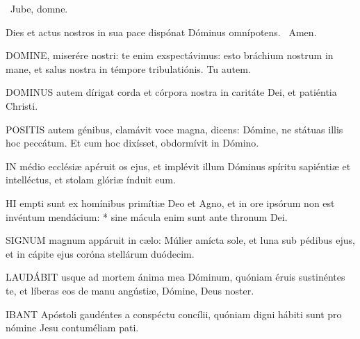 \V\ Jube, domne.

 Dies et actus nostros in sua pace dispónat Dóminus omnípotens. \R\ Amen.



\lettrine[lines=2]{D}{OMINE}, miserére nostri: te enim exspectávimus: esto bráchium nostrum in mane, et salus nostra in témpore tribulatiónis. Tu autem.



\lettrine[lines=2]{D}{OMINUS} autem dírigat corda et córpora nostra in caritáte Dei, et patiéntia Christi.



\lettrine[lines=2]{P}{OSITIS} autem génibus, clamávit voce magna, dicens: Dómine, ne státuas illis hoc peccátum. Et cum hoc dixísset, obdormívit in Dómino.


\lettrine[lines=2]{I}{N} médio ecclésiæ apéruit os ejus, et implévit illum Dóminus spíritu sapiéntiæ et intelléctus, et stolam glóriæ índuit eum.


\lettrine[lines=2]{H}{I} empti sunt ex homínibus primítiæ Deo et Agno, et in ore ipsórum non est invéntum mendácium: * sine mácula enim sunt ante thronum Dei.



\lettrine[lines=2]{S}{IGNUM} magnum appáruit in cælo: Múlier amícta sole, et luna sub pédibus ejus, et in cápite ejus coróna stellárum duódecim.


\lettrine[lines=2]{L}{AUDÁBIT} usque ad mortem ánima mea Dóminum, quóniam éruis sustinéntes te, et líberas eos de manu angústiæ, Dómine, Deus noster.



\lettrine[lines=2]{I}{BANT} Apóstoli gaudéntes a conspéctu concílii, quóniam digni hábiti sunt pro nómine Jesu contuméliam pati.

